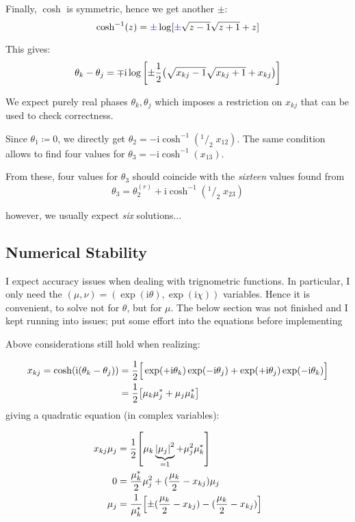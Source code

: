 \documentclass[
	english,
	a4paper,
	fontsize=10pt,
	parskip=half,
	titlepage=true,
	DIV=12,
	final
]{scrreprt}
\newcommand*{\smallfrac}  [2]{\ensuremath{{}^        {#1} \!/_        {#2}}}
\newcommand*{\iunit}{\ensuremath{\mathrm{i}}}
\begin{document}
Finally, $\cosh$ is symmetric, hence we get another $\pm$:
\begin{equation}
	\cosh^{-1}(z) = {\color{blue}\pm} \log[ {\color{blue}\pm} \sqrt{z - 1} \sqrt{z + 1} + z ]
\end{equation}

This gives:
\begin{align}
	\theta_k - \theta_j = \mp \iunit \log\qty[
		\pm \frac{1}{2} \qty( 
			\sqrt{x_{kj} - 1} \sqrt{x_{kj} + 1} + x_{kj} 
	)]
\end{align}

We expect purely real phases $\theta_k, \theta_j$ which imposes a restriction on $x_{kj}$ that can be used to check correctness.

Since $\theta_1 \coloneqq 0$, we directly get $\theta_2 = -\iunit \cosh^{-1}(\smallfrac{1}{2} \; x_{12})$. The same condition allows to find four values for $\theta_3 = -\iunit \cosh^{-1}(x_{13})$.

From these, four values for $\theta_3$ should coincide with the \emph{sixteen} values found from 
\[ \theta_3 = \theta_2^{(r)} + \iunit \cosh^{-1}( \smallfrac{1}{2} \; x_{23}) \]

{\color{red} however, we usually expect \emph{six} solutions...}

\subsection{Numerical Stability}
I expect accuracy issues when dealing with trignometric functions. In particular, I only need the $(\mu, \nu) = (\exp(\iunit \theta), \exp(\iunit \chi))$ variables. Hence it is convenient, to solve not for $\theta$, but for $\mu$. {\color{red} The below section was not finished and I kept running into issues; put some effort into the equations before implementing}

Above considerations still hold when realizing:

\begin{align}
	x_{kj}
=
	\cosh(\iunit (\theta_k - \theta_j))
&=
	\frac{1}{2} \qty[ \Big.
		\exp(+\iunit \theta_k) \exp(-\iunit \theta_j) +
		\exp(+\iunit \theta_j) \exp(-\iunit \theta_k)
	] \\
&=
	\frac{1}{2} \qty[
		\mu_k \mu_j^* +
		\mu_j \mu_k^*
	]
\end{align}
giving a quadratic equation (in complex variables):

\begin{align}
	x_{kj} \mu_j
&=
	\frac{1}{2} \qty[
		\mu_k \underbrace{\abs{\mu_j}^2}_{=1} +
		\mu_j^2 \mu_k^*
	]
\\
	0
&=
	\frac{\mu_k^*}{2} \mu_j^2 +
	(\frac{\mu_k}{2} - x_{kj}) \mu_j
\\
	\mu_j
&=
	\frac{1}{\mu_k^*} \qty[
		\pm (\frac{\mu_k}{2} - x_{kj}) - (\frac{\mu_k}{2} - x_{kj})
	]
\end{align}
\end{document}
